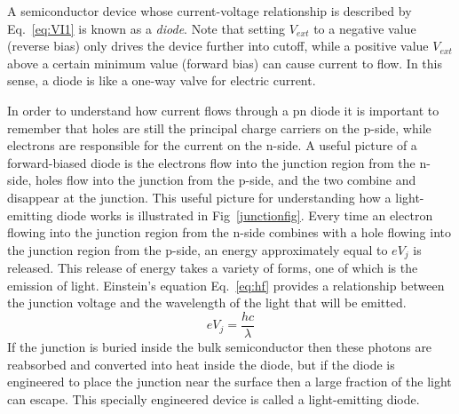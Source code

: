 \documentclass{revtex4}
\begin{document}
A semiconductor device whose current-voltage relationship is described
by Eq.~\ref{eq:VI1} is known as a {\em diode}.  Note that setting $V_{ext}$
to a negative value (reverse bias) only drives the device further into
cutoff, while a positive value $V_{ext}$ above a certain minimum value
(forward bias) can cause current to flow.  In this sense, a diode is like
a one-way valve for electric current.

In order to understand how current flows through a pn diode it
is important to remember that holes are still the principal charge carriers
on the p-side, while electrons are responsible for the current on the n-side.
A useful picture of a forward-biased diode is the electrons flow into the
junction region from the n-side, holes flow into the junction from the p-side,
and the two combine and disappear at the junction.  This useful picture for
understanding how a light-emitting diode works is illustrated in
Fig~\ref{junctionfig}.  Every time an electron
flowing into the junction region from the n-side combines with a hole flowing
into the junction region from the p-side, an energy approximately equal to
$eV_j$ is released.  This release of energy takes a variety of forms, one
of which is the emission of light.  Einstein's equation Eq.~\ref{eq:hf}
provides a relationship between the junction voltage and the wavelength of
the light that will be emitted.
\begin{equation}
eV_j = \frac{hc}{\lambda}
\label{eq:Vjlambda}
\end{equation}
If the junction is buried inside the bulk semiconductor then these photons
are reabsorbed and converted into heat inside the diode, but if the diode is
engineered to place the junction near the surface then a large fraction of
the light can escape.  This specially engineered device is called a
light-emitting diode.
\end{document}
